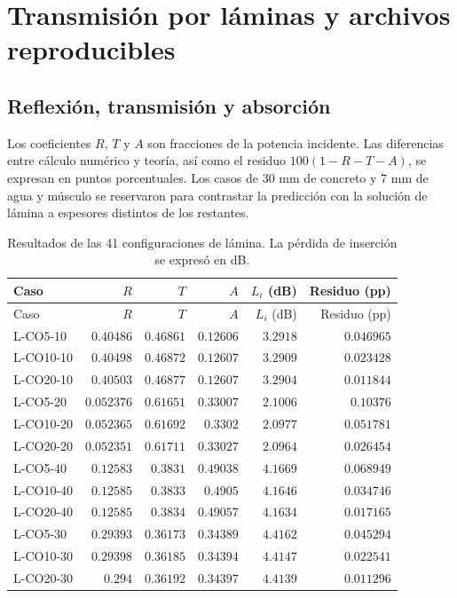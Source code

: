 \chapter{Transmisión por láminas y archivos reproducibles}
\section{Reflexión, transmisión y absorción}
Los coeficientes $R$, $T$ y $A$ son fracciones de la potencia incidente. Las diferencias entre cálculo numérico y teoría, así como el residuo $100(1-R-T-A)$, se expresan en puntos porcentuales. Los casos de 30 mm de concreto y 7 mm de agua y músculo se reservaron para contrastar la predicción con la solución de lámina a espesores distintos de los restantes.
\begingroup\small\setlength{\tabcolsep}{4pt}
\begin{longtable}{lrrrrr}
\caption{Resultados de las 41 configuraciones de lámina. La pérdida de inserción se expresó en dB.}\label{t:lam}\\
\hline Caso & $R$ & $T$ & $A$ & $L_i$ (dB) & Residuo (pp) \\ \hline\endfirsthead
\hline Caso & $R$ & $T$ & $A$ & $L_i$ (dB) & Residuo (pp) \\ \hline\endhead
L-CO5-10 & $0.40486$ & $0.46861$ & $0.12606$ & $3.2918$ & $0.046965$ \\
L-CO10-10 & $0.40498$ & $0.46872$ & $0.12607$ & $3.2909$ & $0.023428$ \\
L-CO20-10 & $0.40503$ & $0.46877$ & $0.12607$ & $3.2904$ & $0.011844$ \\
L-CO5-20 & $0.052376$ & $0.61651$ & $0.33007$ & $2.1006$ & $0.10376$ \\
L-CO10-20 & $0.052365$ & $0.61692$ & $0.3302$ & $2.0977$ & $0.051781$ \\
L-CO20-20 & $0.052351$ & $0.61711$ & $0.33027$ & $2.0964$ & $0.026454$ \\
L-CO5-40 & $0.12583$ & $0.3831$ & $0.49038$ & $4.1669$ & $0.068949$ \\
L-CO10-40 & $0.12585$ & $0.3833$ & $0.4905$ & $4.1646$ & $0.034746$ \\
L-CO20-40 & $0.12585$ & $0.3834$ & $0.49057$ & $4.1634$ & $0.017165$ \\
L-CO5-30 & $0.29393$ & $0.36173$ & $0.34389$ & $4.4162$ & $0.045294$ \\
L-CO10-30 & $0.29398$ & $0.36185$ & $0.34394$ & $4.4147$ & $0.022541$ \\
L-CO20-30 & $0.294$ & $0.36192$ & $0.34397$ & $4.4139$ & $0.011296$ \\

\end{longtable}
